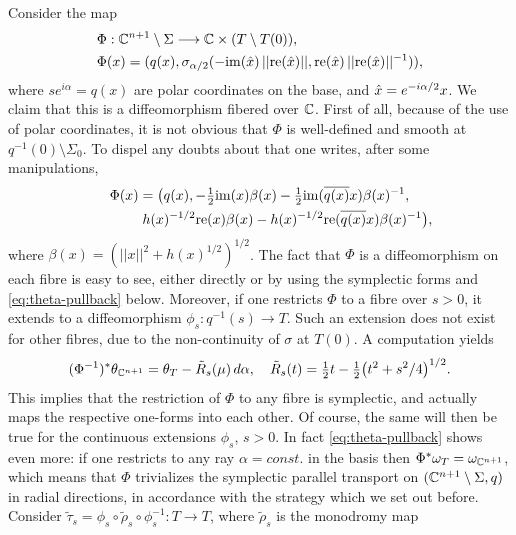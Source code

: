 \documentclass[10pt,letterpaper]{article}
\begin{document}
Consider the map
\begin{equation} \label{eq:phi}
\begin{split}
 & \Phi: \mathbb{C}^{n+1} \setminus \Sigma \longrightarrow \mathbb{C} \times (T \setminus T(0)), \\
 & \Phi(x) = (q(x),\sigma_{\alpha/2}(-\mathrm{im}(\hat{x})\,||\mathrm{re}(\hat{x})||,
 \mathrm{re}(\hat{x})\,||\mathrm{re}(\hat{x})||^{-1})),
\end{split}
\end{equation}
where $s e^{i\alpha} = q(x)$ are polar coordinates on the base, and $\hat{x} =
e^{-i\alpha/2}x$. We claim that this is a diffeomorphism fibered over $\mathbb{C}$.
First of all, because of the use of polar coordinates, it is not obvious that
$\Phi$ is well-defined and smooth at $q^{-1}(0) \setminus \Sigma_0$. To dispel
any doubts about that one writes, after some manipulations,
\begin{gather*}
\Phi(x) = \big(q(x),
 - {\textstyle\frac{1}{2}} \mathrm{im}(x) \beta(x)
 - {\textstyle\frac{1}{2}} \mathrm{im}(\overline{q(x)}x) \beta(x)^{-1}, \\
 \qquad\qquad  h(x)^{-1/2} \mathrm{re}(x) \beta(x)
 - h(x)^{-1/2} \mathrm{re}(\overline{q(x)}x) \beta(x)^{-1}
 \big),
\end{gather*}
where $\beta(x) = (||x||^2 + h(x)^{1/2})^{1/2}$. The fact that $\Phi$ is a
diffeomorphism on each fibre is easy to see, either directly or by using the
symplectic forms and \eqref{eq:theta-pullback} below. Moreover, if one
restricts $\Phi$ to a fibre over $s > 0$, it extends to a diffeomorphism
$\phi_s: q^{-1}(s) \rightarrow T$. Such an extension does not exist for other
fibres, due to the non-continuity of $\sigma$ at $T(0)$. A computation yields
\begin{equation} \label{eq:theta-pullback}
 (\Phi^{-1})^*\theta_{\mathbb{C}^{n+1}} = \theta_T - \tilde{R}_s(\mu)\, d\alpha, \quad
 \tilde{R}_s(t) = {\textstyle\frac{1}{2}} t - {\textstyle\frac{1}{2}}\big(t^2 + s^2/4\big)^{1/2}.
\end{equation}
This implies that the restriction of $\Phi$ to any fibre is symplectic, and
actually maps the respective one-forms into each other. Of course, the same
will then be true for the continuous extensions $\phi_s$, $s>0$. In fact
\eqref{eq:theta-pullback} shows even more: if one restricts to any ray $\alpha
= const.$ in the basis then $\Phi^*\omega_T = \omega_{\mathbb{C}^{n+1}}$, which means that
$\Phi$ trivializes the symplectic parallel transport on $(\mathbb{C}^{n+1} \setminus
\Sigma,q)$ in radial directions, in accordance with the strategy which we set
out before. Consider $\tilde{\tau}_s = \phi_s \circ \tilde{\rho}_s \circ
\phi_s^{-1} : T \rightarrow T$, where $\tilde{\rho}_s$ is the monodromy map
\end{document}
